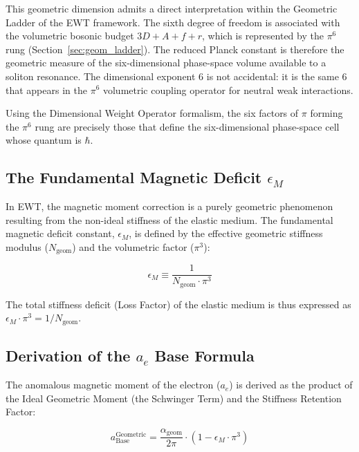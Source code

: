 \documentclass[10pt,a4paper]{article}
\begin{document}
This geometric dimension admits a direct interpretation within the
Geometric Ladder of the EWT framework. The sixth degree of freedom
is associated with the volumetric bosonic budget
\(3D + A + f + r\), which is represented by the \(\pi^{6}\) rung (Section~\ref{sec:geom_ladder}).
The reduced Planck constant is therefore the geometric measure of
the six-dimensional phase-space volume available to a soliton
resonance. The dimensional exponent \(6\) is not accidental: it is
the same \(6\) that appears in the \(\pi^{6}\) volumetric coupling
operator for neutral weak interactions.

Using the Dimensional Weight Operator formalism, the six factors
of \(\pi\) forming the \(\pi^{6}\) rung are precisely those that
define the six-dimensional phase-space cell whose quantum is
\(\hbar\).

\subsection{The Fundamental Magnetic Deficit $\epsilon_M$}
\label{sec:magnetic_deficit_amm}

In EWT, the magnetic moment correction is a purely geometric phenomenon resulting from the non-ideal stiffness of the elastic medium. The fundamental magnetic deficit constant, $\epsilon_M$, is defined by the effective geometric stiffness modulus ($N_{\text{geom}}$) and the volumetric factor ($\pi^3$):

\begin{equation}
	\label{eq:epsilon_M_fundamental}
	\epsilon_M \equiv \frac{1}{N_{\text{geom}} \cdot \pi^3}
\end{equation}

The total stiffness deficit (Loss Factor) of the elastic medium is thus expressed as $\epsilon_M \cdot \pi^3 = 1/N_{\text{geom}}$.

\subsection{Derivation of the $a_e$ Base Formula}
\label{sec:a_e_derivation}

The anomalous magnetic moment of the electron ($a_e$) is derived as the product of the Ideal Geometric Moment (the Schwinger Term) and the Stiffness Retention Factor:

\begin{equation}
	\label{eq:a_base_geom}
	\boxed{a_{\text{Base}}^{\text{Geometric}} = \frac{\alpha_{\text{geom}}}{2\pi} \cdot \left( 1 - \epsilon_M \cdot \pi^3 \right)}
\end{equation}
\end{document}
